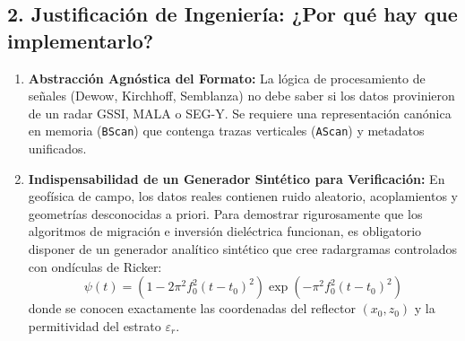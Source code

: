 \documentclass[11pt,a4paper]{article}
\begin{document}
\subsection{2. Justificación de Ingeniería: ¿Por qué hay que implementarlo?}
\begin{enumerate}
    \item \textbf{Abstracción Agnóstica del Formato:} La lógica de procesamiento de señales (Dewow, Kirchhoff, Semblanza) no debe saber si los datos provinieron de un radar GSSI, MALA o SEG-Y. Se requiere una representación canónica en memoria (\texttt{BScan}) que contenga trazas verticales (\texttt{AScan}) y metadatos unificados.
    \item \textbf{Indispensabilidad de un Generador Sintético para Verificación:} En geofísica de campo, los datos reales contienen ruido aleatorio, acoplamientos y geometrías desconocidas a priori. Para demostrar rigurosamente que los algoritmos de migración e inversión dieléctrica funcionan, es obligatorio disponer de un generador analítico sintético que cree radargramas controlados con ondículas de Ricker:
    \begin{equation}
        \psi(t) = \left(1 - 2\pi^2 f_0^2 (t - t_0)^2\right) \exp\left(-\pi^2 f_0^2 (t - t_0)^2\right)
    \end{equation}
    donde se conocen exactamente las coordenadas del reflector $(x_0, z_0)$ y la permitividad del estrato $\varepsilon_r$.
\end{enumerate}
\end{document}
